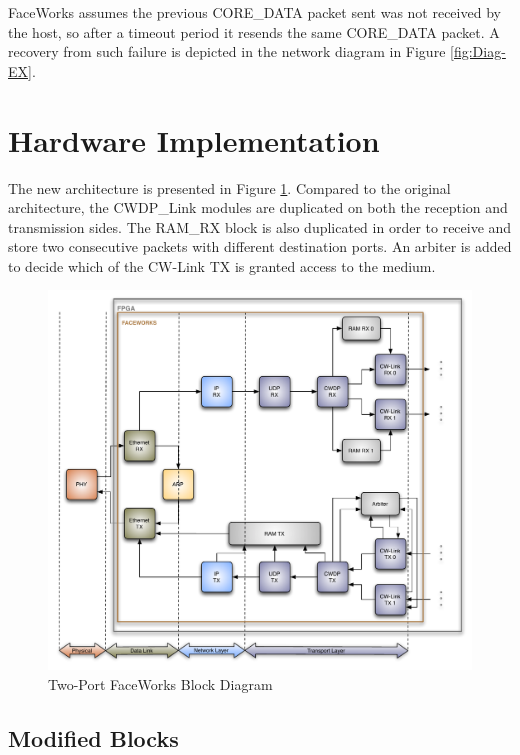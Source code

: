 \documentclass[defaultstyle,10pt,master,Helvetica]{thesis}
\begin{document}
FaceWorks assumes the previous CORE\_DATA packet sent was not received by the host, so after a timeout period it resends the same CORE\_DATA packet. A recovery from such failure is depicted in the network diagram in Figure \ref{fig:Diag-EX}.

\clearpage

\section{Hardware Implementation}

The new architecture is presented in Figure \ref{fig:FW-Final}. Compared to the original architecture, the CWDP\_Link modules are duplicated on both the reception and transmission sides.  The RAM\_RX block is also duplicated in order to receive and store two consecutive packets with different destination ports. An arbiter is added to decide which of the CW-Link TX is granted access to the medium.


\begin{figure}[h]
  \centering
      \includegraphics[scale=0.8,center]{Diagrams/FW-Final.pdf}
  \caption{Two-Port FaceWorks Block Diagram}\label{fig:FW-Final}
\end{figure}
\clearpage
\subsection{Modified Blocks}
\end{document}
